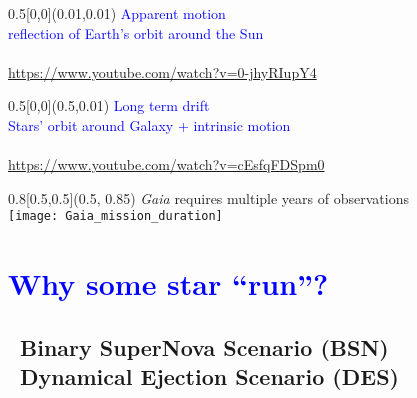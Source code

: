 \documentclass[xcolor=dvipsnames,professionalfonts, aspectratio=169]{beamer}
\begin{document}
\begin{frame}[c,plain]
  \begin{textblock}{0.5}[0,0](0.01,0.01)
    \centering
    \textcolor{Blue}{{\large Apparent motion}\\
      {\small reflection of Earth's orbit around the Sun}}\\[20pt]
    \vfill
      \\
      \textcolor{gray!50}{\tiny \url{https://www.youtube.com/watch?v=0-jhyRIupY4}}
    \end{textblock}
    \begin{textblock}{0.5}[0,0](0.5,0.01)
      \centering
      \textcolor{Blue}{{\large Long term drift}\\
        {\small Stars' orbit around Galaxy + intrinsic motion}}\\[18pt]
      \vfill
      \\
      \textcolor{gray!50}{\tiny \url{https://www.youtube.com/watch?v=cEsfqFDSpm0}}
    \end{textblock}
    \begin{textblock}{0.8}[0.5,0.5](0.5, 0.85)
      \centering
      \emph{Gaia} requires multiple years of observations\\
      \texttt{[image: Gaia\_mission\_duration]}
    \end{textblock}
\end{frame}



\section{\textcolor{Blue}{Why some star ``run''?}}
\subsection{\textcolor{Blue}{\textbullet}~Binary SuperNova Scenario
  (BSN) \\\textcolor{Blue}{\textbullet}~Dynamical Ejection Scenario (DES)}
\end{document}
